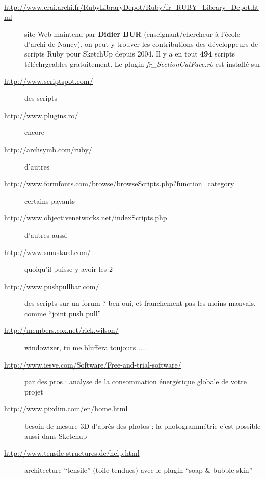\documentclass[a4paper,12pt,french]{sphinxmanual}
\begin{document}
\begin{description}
\item[{\url{http://www.crai.archi.fr/RubyLibraryDepot/Ruby/fr\_RUBY\_Library\_Depot.html}}] \leavevmode
site Web maintenu par \textbf{Didier BUR} (enseignant/chercheur à l'école d'archi de Nancy). on peut y trouver les contributions des développeurs de scripts Ruby pour SketchUp depuis 2004. Il y a en tout \textbf{494} scripts téléchrgeables gratuitement. Le plugin \emph{fr\_SectionCutFace.rb} est installé sur {\hyperref[su/export\string-dwg:export\string-dwg\string-coupes]{}}

\item[{\url{http://www.scriptspot.com/}}] \leavevmode
des scripts

\item[{\url{http://www.plugins.ro/}}] \leavevmode
encore

\item[{\url{http://archsymb.com/ruby/}}] \leavevmode
d'autres

\item[{\url{http://www.formfonts.com/browse/browseScripts.php?function=category}}] \leavevmode
certains payants

\item[{\url{http://www.objectivenetworks.net/indexScripts.php}}] \leavevmode
d'autres aussi

\item[{\url{http://www.smustard.com/}}] \leavevmode
quoiqu'il puisse y avoir les 2

\item[{\url{http://www.pushpullbar.com/}}] \leavevmode
des scripts sur un forum ? ben oui, et franchement pas les moins mauvais, comme ``joint push pull''

\item[{\url{http://members.cox.net/rick.wilson/}}] \leavevmode
windowizer, tu me bluffera toujours ....

\item[{\url{http://www.iesve.com/Software/Free-and-trial-software/}}] \leavevmode
par des pros : analyse de la consommation énergétique globale de votre projet

\item[{\url{http://www.pixdim.com/en/home.html}}] \leavevmode
besoin de mesure 3D d'après des photos : la photogrammétrie c'est possible aussi dans Sketchup

\item[{\url{http://www.tensile-structures.de/help.html}}] \leavevmode
architecture ``tensile'' (toile tendues) avec le plugin ``soap \& bubble skin''


\end{description}
\end{document}
